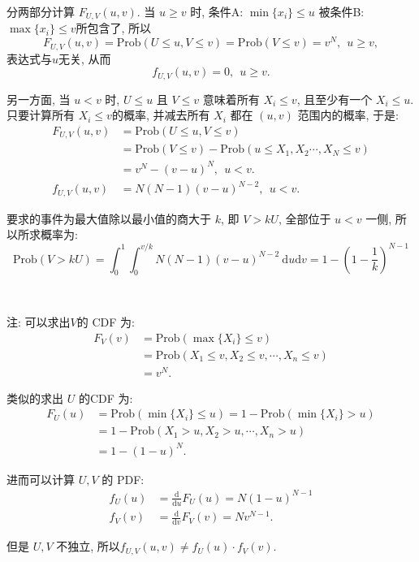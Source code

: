 分两部分计算 $F_{U,V}(u,v)$. 当 $u\ge v$ 时, 条件A: $\min\{x_i\}\le u$ 被条件B: $\max\{x_i\}\le v$所包含了, 所以 
$$F_{U,V}(u,v) = \mathrm{Prob}(U\le u, V\le v) = \mathrm{Prob}(V\le v) = v^N,\ \ u\ge v , $$ 
表达式与$u$无关, 从而
$$f_{U,V}(u,v) = 0,\ \ u\ge v .$$

另一方面, 当 $u < v$ 时, $U\le u$ 且 $V\le v$ 意味着所有 $X_i \le v$, 且至少有一个 $X_i \le u$. 只要计算所有 $X_i \le v$的概率, 并减去所有 $X_i$ 都在 $(u,v)$ 范围内的概率, 于是:
\begin{align*}
F_{U,V}(u,v) &= \mathrm{Prob}(U\le u, V\le v) \\
&= \mathrm{Prob}(V\le v) - \mathrm{Prob}(u\le X_1,X_2\cdots,X_N\le v) \\
&= v^N - (v-u)^N,\ \ u < v.\\
f_{U,V}(u,v) &= N(N-1)(v-u)^{N-2}, \ \ u < v.
\end{align*}

要求的事件为最大值除以最小值的商大于 $k$, 即 $V > kU$, 全部位于 $u<v$ 一侧, 所以所求概率为:
\[
\mathrm{Prob}(V > kU) = \int_0^1\int_0^{v/k}{N(N-1)(v-u)^{N-2}}\ \mathrm{d}u\mathrm{d}v = 1 - \left(1 - \frac{1}{k}\right)^{N-1}
\]

~

注: 可以求出$V$的 CDF 为:
\begin{align*}
F_V(v) &= \mathrm{Prob}(\max\{X_i\} \le v)\\
&= \mathrm{Prob}(X_1\le v, X_2\le v, \cdots, X_n\le v) \\
&= v^N .
\end{align*}

类似的求出 $U$ 的CDF 为:
\begin{align*}
F_U(u) &= \mathrm{Prob}(\min\{X_i\} \le u) = 1- \mathrm{Prob}(\min\{X_i\} > u)\\
 &= 1 - \mathrm{Prob}(X_1 > u, X_2 > u, \cdots, X_n > u)\\ 
 &= 1 - (1-u)^N.
\end{align*}

进而可以计算 $U,V$ 的 PDF:
\begin{align*}
f_U(u) &= \frac{\mathrm{d}}{\mathrm{d}u}F_U(u) = N(1-u)^{N-1} \\
f_V(v) &= \frac{\mathrm{d}}{\mathrm{d}v}F_V(v) = Nv^{N-1} .
\end{align*}

但是 $U,V$ 不独立, 所以$f_{U,V}(u,v) \neq f_U(u)\cdot f_V(v)$.


\newpage

